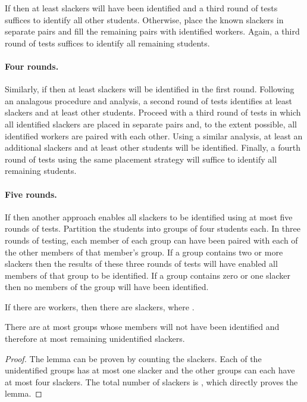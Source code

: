 \documentclass[11pt]{llncs}
\renewcommand{\subsection}[1]{\paragraph{\bf #1.}}
\begin{document}
If  then at least  slackers will have been identified and
a third round of tests suffices to identify all other students.
Otherwise, place the  known slackers in separate pairs and fill the remaining
 pairs with  identified workers.
Again, a third round of tests suffices to identify all remaining students.

\subsection{Four rounds}
Similarly, if  then at least  slackers will be
identified in the first round.
Following an analagous procedure and analysis, a second round of tests
identifies at least  slackers and at least  other students.
Proceed with a third round of tests in which all identified slackers are placed
in separate pairs and, to the extent possible, all identified workers are paired
with each other.  Using a similar analysis, at least an additional 
slackers and at least  other students will be identified.
Finally, a fourth round of tests using the same placement strategy will suffice
to identify all remaining students.

\subsection{Five rounds}
If  then another approach enables all slackers to be identified
using at most five rounds of tests.
Partition the  students into  groups of four students each.
In three rounds of testing, each member of each group can have been paired with each
of the other members of that member's group.
If a group contains two or more slackers then the results of these three rounds of
tests will have enabled all members of that group to be identified.
If a group contains zero or one slacker then no members of the group will have been
identified.

If there are  workers, then there are  slackers,
where .

\begin{lemma}
There are at most  groups whose members will
not have been identified and therefore at most  remaining unidentified slackers.
\end{lemma}
\begin{proof}
The lemma can be proven by counting the slackers.
Each of the  unidentified groups has at most one slacker
and the other  groups can each have at most four slackers.
The total number of slackers is ,
which directly proves the lemma.
\end{proof}
\end{document}
